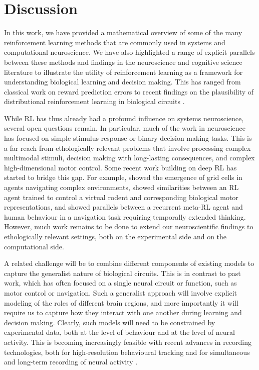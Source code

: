 \section{Discussion}
\label{sec:discussion}

In this work, we have provided a mathematical overview of some of the many reinforcement learning methods that are commonly used in systems and computational neuroscience.
We have also highlighted a range of explicit parallels between these methods and findings in the neuroscience and cognitive science literature to illustrate the utility of reinforcement learning as a framework for understanding biological learning and decision making.
This has ranged from classical work on reward prediction errors \citep{schultz1997neural} to recent findings on the plausibility of distributional reinforcement learning in biological circuits \citep{dabney2020distributional}.

While RL has thus already had a profound influence on systems neuroscience, several open questions remain.
In particular, much of the work in neuroscience has focused on simple stimulus-response or binary decision making tasks.
This is a far reach from ethologically relevant problems that involve processing complex multimodal stimuli, decision making with long-lasting consequences, and complex high-dimensional motor control.
Some recent work building on deep RL has started to bridge this gap.
For example, \citet{banino2018vector} showed the emergence of grid cells in agents navigating complex environments, \citet{aldarondo2024virtual} showed similarities between an RL agent trained to control a virtual rodent and corresponding biological motor representations, and \citet{jensen2023recurrent} showed parallels between a recurrent meta-RL agent and human behaviour in a navigation task requiring temporally extended thinking.
However, much work remains to be done to extend our neuroscientific findings to ethologically relevant settings, both on the experimental side and on the computational side.

A related challenge will be to combine different components of existing models to capture the generalist nature of biological circuits.
This is in contrast to past work, which has often focused on a single neural circuit or function, such as motor control or navigation.
Such a generalist approach will involve explicit modeling of the roles of different brain regions, and more importantly it will require us to capture how they interact with one another during learning and decision making.
Clearly, such models will need to be constrained by experimental data, both at the level of behaviour and at the level of neural activity.
This is becoming increasingly feasible with recent advances in recording technologies, both for high-resolution behavioural tracking \citep{mathis2018deeplabcut,dunn2021geometric} and for simultaneous and long-term recording of neural activity \citep{steinmetz2021neuropixels, pachitariu2016suite2p, dhawale2017automated}.

